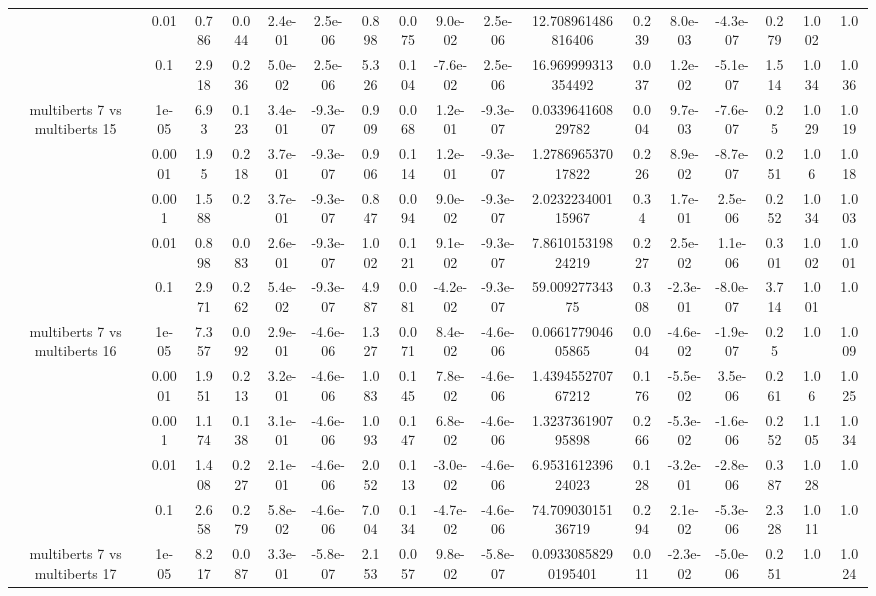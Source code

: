 \begin{tabular}{|c|c|c|c|c|c|c|c|c|c|c|c|c|c|c|c|c|}
 & 0.01 & 0.786 & 0.044 & 2.4e-01 & 2.5e-06 & 0.898 & 0.075 & 9.0e-02 & 2.5e-06 & 12.708961486816406 & 0.239 & 8.0e-03 & -4.3e-07 & 0.279 & 1.002 & 1.0 \\
 & 0.1 & 2.918 & 0.236 & 5.0e-02 & 2.5e-06 & 5.326 & 0.104 & -7.6e-02 & 2.5e-06 & 16.969999313354492 & 0.037 & 1.2e-02 & -5.1e-07 & 1.514 & 1.034 & 1.036 \\
\hline
\multirow{5}{*}{multiberts 7 vs multiberts 15} & 1e-05 & 6.93 & 0.123 & 3.4e-01 & -9.3e-07 & 0.909 & 0.068 & 1.2e-01 & -9.3e-07 & 0.033964160829782 & 0.004 & 9.7e-03 & -7.6e-07 & 0.25 & 1.029 & 1.019 \\
 & 0.0001 & 1.95 & 0.218 & 3.7e-01 & -9.3e-07 & 0.906 & 0.114 & 1.2e-01 & -9.3e-07 & 1.278696537017822 & 0.226 & 8.9e-02 & -8.7e-07 & 0.251 & 1.06 & 1.018 \\
 & 0.001 & 1.588 & 0.2 & 3.7e-01 & -9.3e-07 & 0.847 & 0.094 & 9.0e-02 & -9.3e-07 & 2.023223400115967 & 0.34 & 1.7e-01 & 2.5e-06 & 0.252 & 1.034 & 1.003 \\
 & 0.01 & 0.898 & 0.083 & 2.6e-01 & -9.3e-07 & 1.002 & 0.121 & 9.1e-02 & -9.3e-07 & 7.861015319824219 & 0.227 & 2.5e-02 & 1.1e-06 & 0.301 & 1.002 & 1.001 \\
 & 0.1 & 2.971 & 0.262 & 5.4e-02 & -9.3e-07 & 4.987 & 0.081 & -4.2e-02 & -9.3e-07 & 59.00927734375 & 0.308 & -2.3e-01 & -8.0e-07 & 3.714 & 1.001 & 1.0 \\
\hline
\multirow{5}{*}{multiberts 7 vs multiberts 16} & 1e-05 & 7.357 & 0.092 & 2.9e-01 & -4.6e-06 & 1.327 & 0.071 & 8.4e-02 & -4.6e-06 & 0.066177904605865 & 0.004 & -4.6e-02 & -1.9e-07 & 0.25 & 1.0 & 1.009 \\
 & 0.0001 & 1.951 & 0.213 & 3.2e-01 & -4.6e-06 & 1.083 & 0.145 & 7.8e-02 & -4.6e-06 & 1.439455270767212 & 0.176 & -5.5e-02 & 3.5e-06 & 0.261 & 1.06 & 1.025 \\
 & 0.001 & 1.174 & 0.138 & 3.1e-01 & -4.6e-06 & 1.093 & 0.147 & 6.8e-02 & -4.6e-06 & 1.323736190795898 & 0.266 & -5.3e-02 & -1.6e-06 & 0.252 & 1.105 & 1.034 \\
 & 0.01 & 1.408 & 0.227 & 2.1e-01 & -4.6e-06 & 2.052 & 0.113 & -3.0e-02 & -4.6e-06 & 6.953161239624023 & 0.128 & -3.2e-01 & -2.8e-06 & 0.387 & 1.028 & 1.0 \\
 & 0.1 & 2.658 & 0.279 & 5.8e-02 & -4.6e-06 & 7.004 & 0.134 & -4.7e-02 & -4.6e-06 & 74.70903015136719 & 0.294 & 2.1e-02 & -5.3e-06 & 2.328 & 1.011 & 1.0 \\
\hline
\multirow{5}{*}{multiberts 7 vs multiberts 17} & 1e-05 & 8.217 & 0.087 & 3.3e-01 & -5.8e-07 & 2.153 & 0.057 & 9.8e-02 & -5.8e-07 & 0.09330858290195401 & 0.011 & -2.3e-02 & -5.0e-06 & 0.251 & 1.0 & 1.024 \\

\end{tabular}
